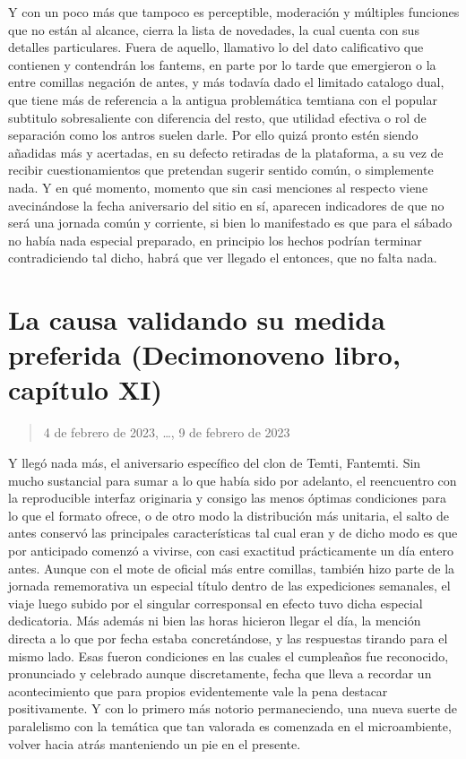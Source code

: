 \documentclass[
]{book}
\begin{document}
Y con un poco más que tampoco es perceptible, moderación y múltiples funciones que no están al alcance, cierra la lista de novedades, la cual cuenta con sus detalles particulares. Fuera de aquello, llamativo lo del dato calificativo que contienen y contendrán los fantems, en parte por lo tarde que emergieron o la entre comillas negación de antes, y más todavía dado el limitado catalogo dual, que tiene más de referencia a la antigua problemática temtiana con el popular subtitulo sobresaliente con diferencia del resto, que utilidad efectiva o rol de separación como los antros suelen darle. Por ello quizá pronto estén siendo añadidas más y acertadas, en su defecto retiradas de la plataforma, a su vez de recibir cuestionamientos que pretendan sugerir sentido común, o simplemente nada. Y en qué momento, momento que sin casi menciones al respecto viene avecinándose la fecha aniversario del sitio en sí, aparecen indicadores de que no será una jornada común y corriente, si bien lo manifestado es que para el sábado no había nada especial preparado, en principio los hechos podrían terminar contradiciendo tal dicho, habrá que ver llegado el entonces, que no falta nada.

\hypertarget{la-causa-validando-su-medida-preferida-decimonoveno-libro-capuxedtulo-xi}{%
\section{La causa validando su medida preferida (Decimonoveno libro, capítulo XI)}\label{la-causa-validando-su-medida-preferida-decimonoveno-libro-capuxedtulo-xi}}

\begin{quote}
4 de febrero de 2023, \ldots, 9 de febrero de 2023
\end{quote}

Y llegó nada más, el aniversario específico del clon de Temti, Fantemti. Sin mucho sustancial para sumar a lo que había sido por adelanto, el reencuentro con la reproducible interfaz originaria y consigo las menos óptimas condiciones para lo que el formato ofrece, o de otro modo la distribución más unitaria, el salto de antes conservó las principales características tal cual eran y de dicho modo es que por anticipado comenzó a vivirse, con casi exactitud prácticamente un día entero antes. Aunque con el mote de oficial más entre comillas, también hizo parte de la jornada rememorativa un especial título dentro de las expediciones semanales, el viaje luego subido por el singular corresponsal en efecto tuvo dicha especial dedicatoria. Más además ni bien las horas hicieron llegar el día, la mención directa a lo que por fecha estaba concretándose, y las respuestas tirando para el mismo lado. Esas fueron condiciones en las cuales el cumpleaños fue reconocido, pronunciado y celebrado aunque discretamente, fecha que lleva a recordar un acontecimiento que para propios evidentemente vale la pena destacar positivamente. Y con lo primero más notorio permaneciendo, una nueva suerte de paralelismo con la temática que tan valorada es comenzada en el microambiente, volver hacia atrás manteniendo un pie en el presente.
\end{document}
